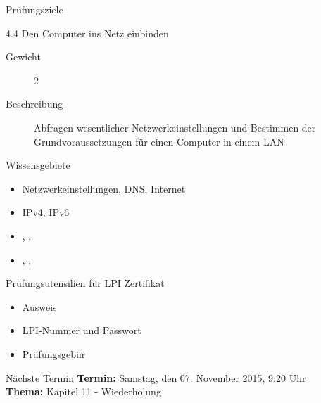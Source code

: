 \documentclass[aspectratio=43]{beamer}
\begin{document}
\begin{frame}{Prüfungsziele}
  \begin{alertblock}{4.4 Den Computer ins Netz einbinden}
    \begin{description}
      \item[Gewicht]  2
      \item[Beschreibung] Abfragen wesentlicher Netzwerkeinstellungen und Bestimmen der 
              Grundvoraussetzungen für einen Computer in einem LAN
    \end{description}
       Wissensgebiete\\ 
        \begin{itemize}
          \item Netzwerkeinstellungen, DNS, Internet
          \item IPv4, IPv6
          \item {}, , 
          \item {}, , 
        \end{itemize}
  \end{alertblock}
\end{frame}

\begin{frame}[plain]
  \begin{alertblock}{Prüfungsutensilien für LPI Zertifikat}
    \begin{itemize}
      \item Ausweis
      \item LPI-Nummer und Passwort
      \item Prüfungsgebür
    \end{itemize}
  \end{alertblock}
\end{frame}
\begin{frame}[plain]
  \begin{alertblock}{Nächste Termin}
    \textbf{Termin:} Samstag, den 07. November 2015, 9:20 Uhr\\
    \textbf{Thema:} Kapitel 11 - Wiederholung\\
  \end{alertblock}
\end{frame}



\materialframe
\versionframe
\end{document}
